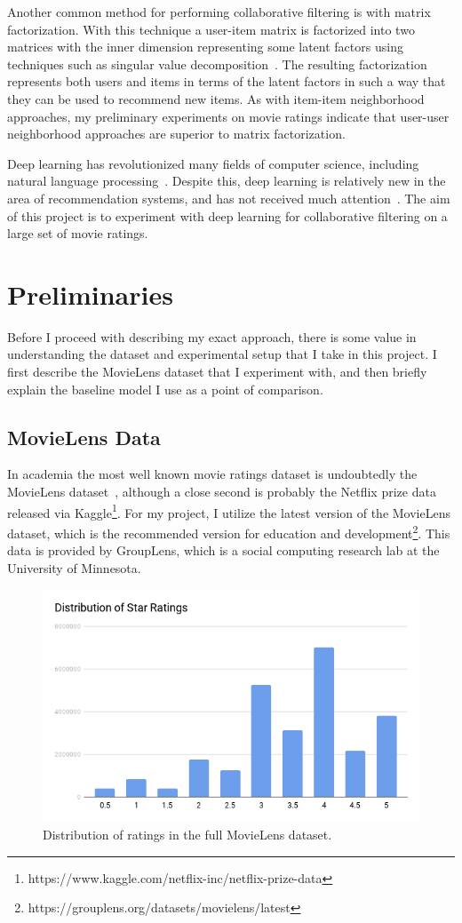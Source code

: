 \documentclass[12pt]{article}
\begin{document}
Another common method for performing collaborative filtering is with matrix
factorization.
With this technique a user-item matrix is factorized into two matrices with the
inner dimension representing some latent factors using techniques such as
singular value decomposition~\cite{matrix-factorization}.
The resulting factorization represents both users and items in terms of the
latent factors in such a way that they can be used to recommend new items.
As with item-item neighborhood approaches, my preliminary experiments on movie
ratings indicate that user-user neighborhood approaches are superior to matrix
factorization.

Deep learning has revolutionized many fields of computer science, including
natural language processing~\cite{deep-survey}.
Despite this, deep learning is relatively new in the area of recommendation
systems, and has not received much attention~\cite{dl-recsys-survey}.
The aim of this project is to experiment with deep learning for collaborative
filtering on a large set of movie ratings.

\section{Preliminaries}

Before I proceed with describing my exact approach, there is some value in
understanding the dataset and experimental setup that I take in this project.
I first describe the MovieLens dataset that I experiment with, and then
briefly explain the baseline model I use as a point of comparison.

\subsection{MovieLens Data}

In academia the most well known movie ratings dataset is undoubtedly the
MovieLens dataset~\cite{movielens},
although a close second is probably the Netflix prize data released via
Kaggle\footnote{https://www.kaggle.com/netflix-inc/netflix-prize-data}.
For my project, I utilize the latest version of the MovieLens
dataset, which is the recommended version for education and
development\footnote{https://grouplens.org/datasets/movielens/latest}.
This data is provided by GroupLens, which is a social computing research lab
at the University of Minnesota.

\begin{figure}
\centering
\includegraphics[width=.5\textwidth]{stars}
\caption{Distribution of ratings in the full MovieLens dataset.}
\label{fig:stars}
\end{figure}
\end{document}
